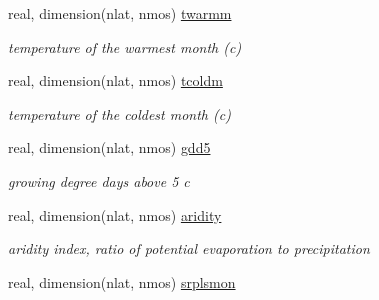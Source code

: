 \begin{DoxyCompactItemize}
\item 
\hypertarget{structctem__statevars_1_1veg__rot_a044811ad94309e1428f0cf49106f6a74}{}real, dimension(nlat, nmos) \hyperlink{structctem__statevars_1_1veg__rot_a044811ad94309e1428f0cf49106f6a74}{twarmm}\label{structctem__statevars_1_1veg__rot_a044811ad94309e1428f0cf49106f6a74}

\begin{DoxyCompactList}\small\item\em temperature of the warmest month (c) \end{DoxyCompactList}\item 
\hypertarget{structctem__statevars_1_1veg__rot_a72ef3fe7dac592152f3546dd0e13b98e}{}real, dimension(nlat, nmos) \hyperlink{structctem__statevars_1_1veg__rot_a72ef3fe7dac592152f3546dd0e13b98e}{tcoldm}\label{structctem__statevars_1_1veg__rot_a72ef3fe7dac592152f3546dd0e13b98e}

\begin{DoxyCompactList}\small\item\em temperature of the coldest month (c) \end{DoxyCompactList}\item 
\hypertarget{structctem__statevars_1_1veg__rot_a8f2cb41a132e5ed3cafcc50aa32f1f8a}{}real, dimension(nlat, nmos) \hyperlink{structctem__statevars_1_1veg__rot_a8f2cb41a132e5ed3cafcc50aa32f1f8a}{gdd5}\label{structctem__statevars_1_1veg__rot_a8f2cb41a132e5ed3cafcc50aa32f1f8a}

\begin{DoxyCompactList}\small\item\em growing degree days above 5 c \end{DoxyCompactList}\item 
\hypertarget{structctem__statevars_1_1veg__rot_a5e65e82e9dcf6376728626ec8816d7f0}{}real, dimension(nlat, nmos) \hyperlink{structctem__statevars_1_1veg__rot_a5e65e82e9dcf6376728626ec8816d7f0}{aridity}\label{structctem__statevars_1_1veg__rot_a5e65e82e9dcf6376728626ec8816d7f0}

\begin{DoxyCompactList}\small\item\em aridity index, ratio of potential evaporation to precipitation \end{DoxyCompactList}\item 
\hypertarget{structctem__statevars_1_1veg__rot_a7e47bb1275883daf396f8895544df1c1}{}real, dimension(nlat, nmos) \hyperlink{structctem__statevars_1_1veg__rot_a7e47bb1275883daf396f8895544df1c1}{srplsmon}\label{structctem__statevars_1_1veg__rot_a7e47bb1275883daf396f8895544df1c1}


\end{DoxyCompactItemize}
